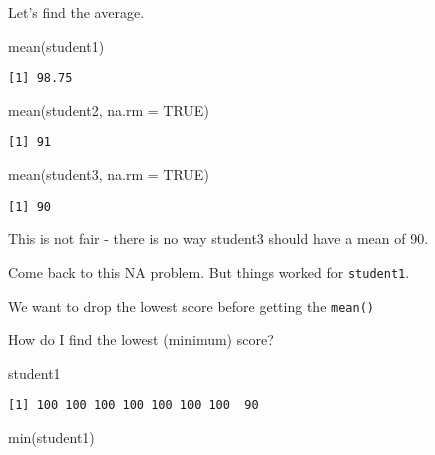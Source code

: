 \documentclass[
  letterpaper,
  DIV=11,
  numbers=noendperiod]{scrartcl}
\newenvironment{Shaded}{\begin{snugshade}}{\end{snugshade}}
\newcommand{\AttributeTok}[1]{\textcolor[rgb]{0.40,0.45,0.13}{#1}}
\newcommand{\ConstantTok}[1]{\textcolor[rgb]{0.56,0.35,0.01}{#1}}
\newcommand{\FunctionTok}[1]{\textcolor[rgb]{0.28,0.35,0.67}{#1}}
\newcommand{\NormalTok}[1]{\textcolor[rgb]{0.00,0.23,0.31}{#1}}
\begin{document}
Let's find the average.

\begin{Shaded}
\begin{Highlighting}[]
\FunctionTok{mean}\NormalTok{(student1)}
\end{Highlighting}
\end{Shaded}

\begin{verbatim}
[1] 98.75
\end{verbatim}

\begin{Shaded}
\begin{Highlighting}[]
\FunctionTok{mean}\NormalTok{(student2, }\AttributeTok{na.rm =} \ConstantTok{TRUE}\NormalTok{)}
\end{Highlighting}
\end{Shaded}

\begin{verbatim}
[1] 91
\end{verbatim}

\begin{Shaded}
\begin{Highlighting}[]
\FunctionTok{mean}\NormalTok{(student3, }\AttributeTok{na.rm =} \ConstantTok{TRUE}\NormalTok{)}
\end{Highlighting}
\end{Shaded}

\begin{verbatim}
[1] 90
\end{verbatim}

This is not fair - there is no way student3 should have a mean of 90.

Come back to this NA problem. But things worked for \texttt{student1}.

We want to drop the lowest score before getting the \texttt{mean()}

How do I find the lowest (minimum) score?

\begin{Shaded}
\begin{Highlighting}[]
\NormalTok{student1}
\end{Highlighting}
\end{Shaded}

\begin{verbatim}
[1] 100 100 100 100 100 100 100  90
\end{verbatim}

\begin{Shaded}
\begin{Highlighting}[]
\FunctionTok{min}\NormalTok{(student1)}
\end{Highlighting}
\end{Shaded}
\end{document}
